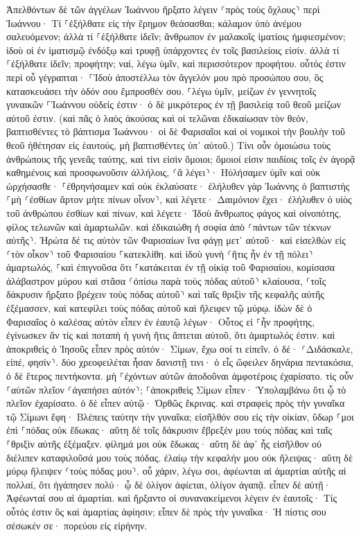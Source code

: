 \documentclass[twoside, 9pt]{extreport}
\begin{document}
Ἀπελθόντων δὲ τῶν ἀγγέλων Ἰωάννου ἤρξατο λέγειν ⸂πρὸς τοὺς ὄχλους⸃ περὶ Ἰωάννου· Τί ⸀ἐξήλθατε εἰς τὴν ἔρημον θεάσασθαι; κάλαμον ὑπὸ ἀνέμου σαλευόμενον; 
ἀλλὰ τί ⸀ἐξήλθατε ἰδεῖν; ἄνθρωπον ἐν μαλακοῖς ἱματίοις ἠμφιεσμένον; ἰδοὺ οἱ ἐν ἱματισμῷ ἐνδόξῳ καὶ τρυφῇ ὑπάρχοντες ἐν τοῖς βασιλείοις εἰσίν. 
ἀλλὰ τί ⸀ἐξήλθατε ἰδεῖν; προφήτην; ναί, λέγω ὑμῖν, καὶ περισσότερον προφήτου. 
οὗτός ἐστιν περὶ οὗ γέγραπται· ⸀Ἰδοὺ ἀποστέλλω τὸν ἄγγελόν μου πρὸ προσώπου σου, ὃς κατασκευάσει τὴν ὁδόν σου ἔμπροσθέν σου. 
⸀λέγω ὑμῖν, μείζων ἐν γεννητοῖς γυναικῶν ⸀Ἰωάννου οὐδείς ἐστιν· ὁ δὲ μικρότερος ἐν τῇ βασιλείᾳ τοῦ θεοῦ μείζων αὐτοῦ ἐστιν. 
(καὶ πᾶς ὁ λαὸς ἀκούσας καὶ οἱ τελῶναι ἐδικαίωσαν τὸν θεόν, βαπτισθέντες τὸ βάπτισμα Ἰωάννου· 
οἱ δὲ Φαρισαῖοι καὶ οἱ νομικοὶ τὴν βουλὴν τοῦ θεοῦ ἠθέτησαν εἰς ἑαυτούς, μὴ βαπτισθέντες ὑπ᾽ αὐτοῦ.) 
Τίνι οὖν ὁμοιώσω τοὺς ἀνθρώπους τῆς γενεᾶς ταύτης, καὶ τίνι εἰσὶν ὅμοιοι; 
ὅμοιοί εἰσιν παιδίοις τοῖς ἐν ἀγορᾷ καθημένοις καὶ προσφωνοῦσιν ἀλλήλοις, ⸂ἃ λέγει⸃· Ηὐλήσαμεν ὑμῖν καὶ οὐκ ὠρχήσασθε· ⸀ἐθρηνήσαμεν καὶ οὐκ ἐκλαύσατε· 
ἐλήλυθεν γὰρ Ἰωάννης ὁ βαπτιστὴς ⸀μὴ ⸂ἐσθίων ἄρτον μήτε πίνων οἶνον⸃, καὶ λέγετε· Δαιμόνιον ἔχει· 
ἐλήλυθεν ὁ υἱὸς τοῦ ἀνθρώπου ἐσθίων καὶ πίνων, καὶ λέγετε· Ἰδοὺ ἄνθρωπος φάγος καὶ οἰνοπότης, φίλος τελωνῶν καὶ ἁμαρτωλῶν. 
καὶ ἐδικαιώθη ἡ σοφία ἀπὸ ⸂πάντων τῶν τέκνων αὐτῆς⸃. 
Ἠρώτα δέ τις αὐτὸν τῶν Φαρισαίων ἵνα φάγῃ μετ᾽ αὐτοῦ· καὶ εἰσελθὼν εἰς ⸂τὸν οἶκον⸃ τοῦ Φαρισαίου ⸀κατεκλίθη. 
καὶ ἰδοὺ γυνὴ ⸂ἥτις ἦν ἐν τῇ πόλει⸃ ἁμαρτωλός, ⸀καὶ ἐπιγνοῦσα ὅτι ⸀κατάκειται ἐν τῇ οἰκίᾳ τοῦ Φαρισαίου, κομίσασα ἀλάβαστρον μύρου 
καὶ στᾶσα ⸂ὀπίσω παρὰ τοὺς πόδας αὐτοῦ⸃ κλαίουσα, ⸂τοῖς δάκρυσιν ἤρξατο βρέχειν τοὺς πόδας αὐτοῦ⸃ καὶ ταῖς θριξὶν τῆς κεφαλῆς αὐτῆς ἐξέμασσεν, καὶ κατεφίλει τοὺς πόδας αὐτοῦ καὶ ἤλειφεν τῷ μύρῳ. 
ἰδὼν δὲ ὁ Φαρισαῖος ὁ καλέσας αὐτὸν εἶπεν ἐν ἑαυτῷ λέγων· Οὗτος εἰ ⸀ἦν προφήτης, ἐγίνωσκεν ἂν τίς καὶ ποταπὴ ἡ γυνὴ ἥτις ἅπτεται αὐτοῦ, ὅτι ἁμαρτωλός ἐστιν. 
καὶ ἀποκριθεὶς ὁ Ἰησοῦς εἶπεν πρὸς αὐτόν· Σίμων, ἔχω σοί τι εἰπεῖν. ὁ δέ· ⸂Διδάσκαλε, εἰπέ, φησίν⸃. 
δύο χρεοφειλέται ἦσαν δανιστῇ τινι· ὁ εἷς ὤφειλεν δηνάρια πεντακόσια, ὁ δὲ ἕτερος πεντήκοντα. 
μὴ ⸀ἐχόντων αὐτῶν ἀποδοῦναι ἀμφοτέροις ἐχαρίσατο. τίς οὖν ⸀αὐτῶν πλεῖον ⸂ἀγαπήσει αὐτόν⸃; 
⸀ἀποκριθεὶς Σίμων εἶπεν· Ὑπολαμβάνω ὅτι ᾧ τὸ πλεῖον ἐχαρίσατο. ὁ δὲ εἶπεν αὐτῷ· Ὀρθῶς ἔκρινας. 
καὶ στραφεὶς πρὸς τὴν γυναῖκα τῷ Σίμωνι ἔφη· Βλέπεις ταύτην τὴν γυναῖκα; εἰσῆλθόν σου εἰς τὴν οἰκίαν, ὕδωρ ⸀μοι ἐπὶ ⸀πόδας οὐκ ἔδωκας· αὕτη δὲ τοῖς δάκρυσιν ἔβρεξέν μου τοὺς πόδας καὶ ταῖς ⸀θριξὶν αὐτῆς ἐξέμαξεν. 
φίλημά μοι οὐκ ἔδωκας· αὕτη δὲ ἀφ᾽ ἧς εἰσῆλθον οὐ διέλιπεν καταφιλοῦσά μου τοὺς πόδας. 
ἐλαίῳ τὴν κεφαλήν μου οὐκ ἤλειψας· αὕτη δὲ μύρῳ ἤλειψεν ⸂τοὺς πόδας μου⸃. 
οὗ χάριν, λέγω σοι, ἀφέωνται αἱ ἁμαρτίαι αὐτῆς αἱ πολλαί, ὅτι ἠγάπησεν πολύ· ᾧ δὲ ὀλίγον ἀφίεται, ὀλίγον ἀγαπᾷ. 
εἶπεν δὲ αὐτῇ· Ἀφέωνταί σου αἱ ἁμαρτίαι. 
καὶ ἤρξαντο οἱ συνανακείμενοι λέγειν ἐν ἑαυτοῖς· Τίς οὗτός ἐστιν ὃς καὶ ἁμαρτίας ἀφίησιν; 
εἶπεν δὲ πρὸς τὴν γυναῖκα· Ἡ πίστις σου σέσωκέν σε· πορεύου εἰς εἰρήνην. 
\end{document}
